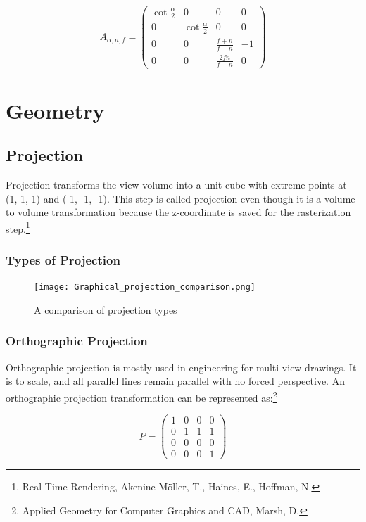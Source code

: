 \documentclass{article}
\begin{document}
\[A_{\alpha, n, f} = 
\begin{pmatrix}
\cot \frac{\alpha}{2} & 0 & 0 & 0 \\
0 & \cot \frac{\alpha}{2} & 0 & 0 \\
0 & 0 & \frac{f+n}{f-n} & -1 \\
0 & 0 & \frac{2fn}{f-n} & 0
\end{pmatrix}\]

\section{Geometry}

\subsection{Projection}
Projection transforms the view volume into a unit cube with extreme points at (1, 1, 1) and (-1, -1, -1). This step is called projection even though it is a volume to volume transformation because the z-coordinate is saved for the rasterization step.\footnote{Real-Time Rendering, Akenine-Möller, T., Haines, E., Hoffman, N.}

\subsubsection{Types of Projection}

\begin{figure}[H]
    \centering
    \texttt{[image: Graphical\_projection\_comparison.png]}
    \caption{A comparison of projection types}
    \label{projectiontypes}
\end{figure}

\subsubsection{Orthographic Projection}
Orthographic projection is mostly used in engineering for multi-view drawings. It is to scale, and all parallel lines remain parallel with no forced perspective. An orthographic projection transformation can be represented as:\footnote{Applied Geometry for Computer Graphics and CAD, Marsh, D.}

\[ P = \begin{pmatrix}
  1 & 0 & 0 & 0 \\
  0 & 1 & 1 & 1 \\ 
  0 & 0 & 0 & 0 \\
  0 & 0 & 0 & 1 
\end{pmatrix}\]	
\end{document}
